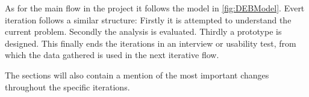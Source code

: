 As for the main flow in the project it follows the model in \cref{fig:DEBModel}.
Evert iteration follows a similar structure:
Firstly it is attempted to understand the current problem.
Secondly the analysis is evaluated.
Thirdly a prototype is designed.
This finally ends the iterations in an interview or usability test, from which the data gathered is used in the next iterative flow.

The sections will also contain a mention of the most important changes throughout the specific iterations.
